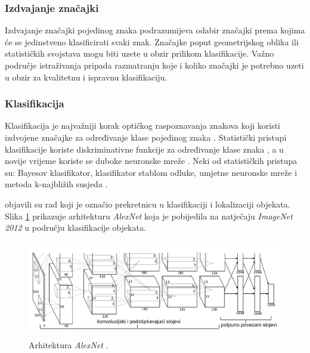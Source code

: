 \documentclass[times, utf8, zavrsni]{fer}
\begin{document}
\pagebreak

\subsubsection{Izdvajanje značajki}
Izdvajanje značajki pojedinog znaka podrazumijeva odabir značajki prema kojima
će se jedinstveno klasificirati svaki znak. Značajke poput geometrijskog oblika
ili statističkih svojstava mogu biti uzete u obzir prilikom klasifikacije.
Važno područje istraživanja pripada razmatranju koje i koliko značajki je
potrebno uzeti u obzir za kvalitetnu i ispravnu klasifikaciju.
\citep{DBLP:journals/corr/abs-1710-05703}


\subsubsection{Klasifikacija}
Klasifikacija je najvažniji korak optičkog raspoznavanja znakova
\citep{verma2012survey,zhu2016novel} koji koristi izdvojene značajke za
određivanje klase pojedinog znaka \citep{lehal1999feature,kaur2016survey}. Statistički pristupi klasifikacije koriste
diskriminativne funkcije za određivanje klase znaka
\citep{DBLP:journals/corr/abs-1710-05703}, a u novije vrijeme koriste se duboke
neuronske mreže \citep{Jurin:2017:Master}. Neki od statističkih pristupa su:
Bayesov klasifikator, klasifikator stablom odluke, umjetne neuronske mreže i
metoda k-najbližih susjeda \citep{DBLP:journals/corr/abs-1710-05703}.

\citep{krizhevsky2012imagenet} objavili su rad koji je označio prekretnicu u
klasifikaciji i lokalizaciji objekata. Slika
\ref{fig:deep-example-01} prikazuje arhitekturu \emph{AlexNet} koja je
pobijedila na natječaju \emph{ImageNet 2012} u području klasifikacije objekata.
\citep{Jurin:2017:Master}

\begin{figure}[!htb]
    \centering
    \includegraphics[height=4.2cm]{images/deep-example-01.png}
    \caption{Arhitektura \emph{AlexNet} \citep{Jurin:2017:Master}.}
    \label{fig:deep-example-01}
\end{figure}
\end{document}
